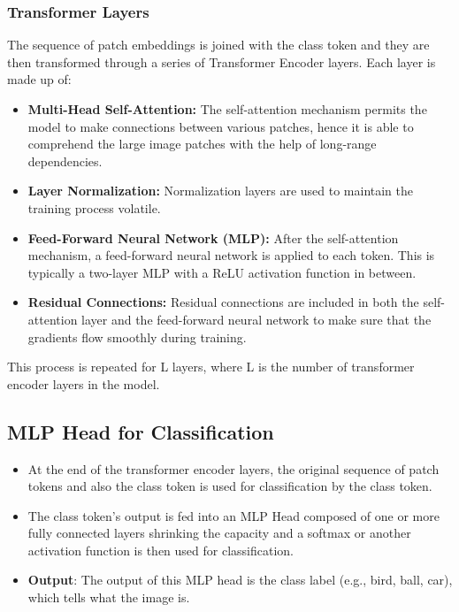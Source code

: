 \subsubsection{Transformer Layers}
The sequence of patch embeddings is joined with the class token and they are then transformed through a series of Transformer Encoder layers. Each layer is made up of:
\begin{itemize}
    \item \textbf{Multi-Head Self-Attention:} The self-attention mechanism permits the model to make connections between various patches, hence it is able to comprehend the large image patches with the help of long-range dependencies.
    \item \textbf{Layer Normalization:} Normalization layers are used to maintain the training process volatile.
    \item \textbf{Feed-Forward Neural Network (MLP):} After the self-attention mechanism, a feed-forward neural network is applied to each token. This is typically a two-layer MLP with a ReLU activation function in between.
    \item \textbf{Residual Connections:} Residual connections are included in both the self-attention layer and the feed-forward neural network to make sure that the gradients flow smoothly during training.
\end{itemize}
This process is repeated for L layers, where L is the number of transformer encoder layers in the model.
\subsection{MLP Head for Classification}
\begin{itemize}
    \item At the end of the transformer encoder layers, the original sequence of patch tokens and also the class token is used for classification by the class token.
    \item The class token's output is fed into an MLP Head composed of one or more fully connected layers shrinking the capacity and a softmax or another activation function is then used for classification.
    \item \textbf{Output}: The output of this MLP head is the class label (e.g., bird, ball, car), which tells what the image is.
\end{itemize}